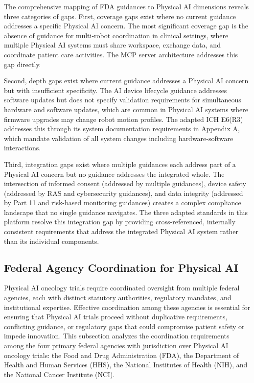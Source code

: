 The comprehensive mapping of FDA guidances to Physical AI dimensions reveals
three categories of gaps. First, coverage gaps exist where no current
guidance addresses a specific Physical AI concern. The most significant
coverage gap is the absence of guidance for multi-robot coordination in
clinical settings, where multiple Physical AI systems must share workspace,
exchange data, and coordinate patient care activities. The MCP server
architecture \cite{national-mcp-paper} addresses this gap directly.

Second, depth gaps exist where current guidance addresses a Physical AI
concern but with insufficient specificity. The AI device lifecycle guidance
addresses software updates but does not specify validation requirements for
simultaneous hardware and software updates, which are common in Physical AI
systems where firmware upgrades may change robot motion profiles. The adapted
ICH E6(R3) \cite{ich-adapt} addresses this through its system documentation
requirements in Appendix A, which mandate validation of all system changes
including hardware-software interactions.

Third, integration gaps exist where multiple guidances each address part of
a Physical AI concern but no guidance addresses the integrated whole. The
intersection of informed consent (addressed by multiple guidances), device
safety (addressed by RAS and cybersecurity guidances), and data integrity
(addressed by Part 11 and risk-based monitoring guidances) creates a complex
compliance landscape that no single guidance navigates. The three adapted
standards in this platform \cite{ich-adapt, cfr50-adapt, cfr312-adapt}
resolve this integration gap by providing cross-referenced, internally
consistent requirements that address the integrated Physical AI system
rather than its individual components.

\subsection{Federal Agency Coordination for Physical AI}
\label{subsec:federal-agency-coordination}

Physical AI oncology trials require coordinated oversight from multiple
federal agencies, each with distinct statutory authorities, regulatory
mandates, and institutional expertise. Effective coordination among these
agencies is essential for ensuring that Physical AI trials proceed without
duplicative requirements, conflicting guidance, or regulatory gaps that
could compromise patient safety or impede innovation. This subsection
analyzes the coordination requirements among the four primary federal
agencies with jurisdiction over Physical AI oncology trials: the Food and
Drug Administration (FDA), the Department of Health and Human Services (HHS),
the National Institutes of Health (NIH), and the National Cancer Institute
(NCI).

